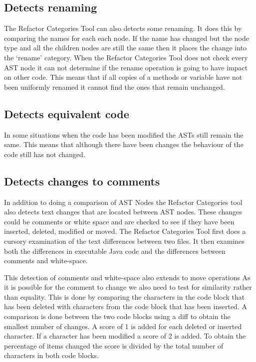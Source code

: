 \subsection{Detects renaming}
The Refactor Categories Tool can also detects some renaming. 
It does this by comparing the names for each each node.
If the name has changed but the node type and all the children nodes are still the same then it places the change into the `rename' category.
When the Refactor Categories Tool does not check every AST node it can not determine if the rename operation is going to have impact on other code.
This means that if all copies of a methods or variable have not been uniformly renamed it cannot find the ones that remain unchanged.

\subsection{Detects equivalent code}
In some situations when the code has been modified the ASTs still remain the same.  
This means that although there have been changes the behaviour of the code still has not changed.

\subsection{Detects changes to comments} 
In addition to doing a comparison of AST Nodes the Refactor Categories tool also detects text changes that are located between AST nodes.
These changes could be comments or white space and are checked to see if they have been inserted, deleted, modified or moved.
The Refactor Categories Tool first does a cursory examination of the text differences between two files.
It then examines both the differences in executable Java code and the differences between comments and white-space. 

This detection of comments and white-space also extends to move operations 
As it is possible for the comment to change we also need to test for similarity rather than equality.  
This is done by comparing the characters in the code block that has been deleted with characters from the code block that has been inserted.  
A comparison is done between the two code blocks using a diff to obtain the smallest number of changes. 
A score of 1 is added for each deleted or inserted character.
If a character has been modified a score of 2 is added. 
To obtain the percentage of items changed the score is divided by the total number of characters in both code blocks.

